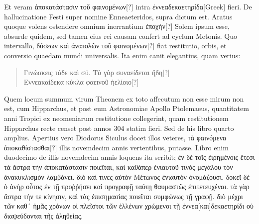 Et veram \textgreek{ἀποκατάστασιν τοῦ φαινομένων[?]}
 intra \textgreek{ἐννεαδεκαετηρίδα[Greek]}
fieri.
De hallucinatione Festi super nomine Enneaeteridos, supra
dictum est.
Aratus quoque volens ostendere omnium inerrantium
\textgreek{ἐποχὴν[?]} Solem ipsum esse, absurde quidem, sed tamen eius
rei causam confert ad cyclum Metonis.
Quo intervallo, \textgreek{δύσεων καὶ ἀνατολῶν τοῦ φαινομένων[?]}
fiat restitutio, orbis, et conversio quaedam
mundi universalis.
Ita enim canit elegantius, quam verius:
\begin{quote}
  \textgreek{Γινώσκεις τάδε καὶ σύ. Τὰ γὰρ συναείδεται ἤδη[?]}\\
  \textgreek{Εννεακαίδεκα κύκλα φαεινοῦ ἠελίοιο[?]}\\
\end{quote}
Quem locum summum virum Theonem ex toto affecutum non
esse mirum non est, cum Hipparchus, et post eum Astronomiae
Apollo Ptolemaeus, quantitatem anni Tropici ex neomeniarum
restitutione collegerint, quam restitutionem Hipparchus recte
censet post annos 304 statim fieri.
Sed de his libro quarto amplius.
Apertius vero Diodorus Siculus docet illos veteres,
 \textgreek{τὰ φαινόμενα ἀποκαθίστασθαι[?]}
illis novemdecim annis vertentibus, putasse.
Libro
enim duodecimo de illis novemdecim annis loquens ita scribit;
\textgreek{ἐν δὲ τοῖς ἐιρημένοις ἔτεσι τὰ ἄστρα τὴν ἀποκατάστασιν ποιεῖται,
 καὶ καθάπερ
ἐνιαυτοῦ τινὸς μεγάλου τὸν ἀνακυκλισμὸν λαμβάνει.}
\textgreek{διὸ καί τινες αὐτὸν Μέτωνος
ἐνιαυτὸν ὀνομάζουσι.}
\textgreek{δοκεῖ δὲ ὁ ἀνὴρ οὗτος ἐν τῇ προῤῥήσει καὶ προγραφῇ
ταύτῃ θαυμαστῶς ἐπιτετευχέναι.}
\textgreek{τὰ γὰρ ἄστρα τήν τε κίνησιν, καὶ τὰς ἐπισημασίας
ποιεῖται συμφώνως τῇ γραφῇ.}
\textgreek{διὸ μέχρι τῶν καθ´ ἡμᾶς χρόνων οἱ πλεῖστοι
τῶν ἑλλένων χρώμενοι τῇ ἐννεα[και]δεκαετηρίδι οὐ διαψεύδονται τῆς ἀληθείας.}
